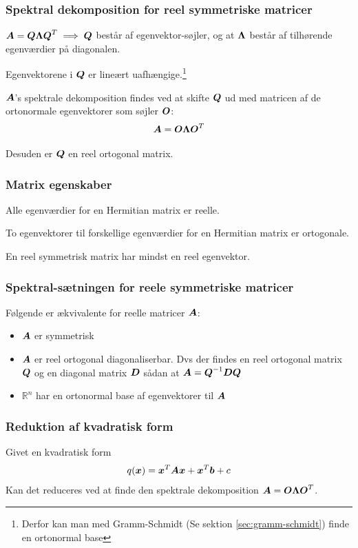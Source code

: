 \subsubsection{Spektral dekomposition for reel symmetriske matricer}

$\boldsymbol{A} = \boldsymbol{Q} \boldsymbol{\Lambda} \boldsymbol{Q}^T \implies \boldsymbol{Q}$ består af egenvektor-søjler, og at $\boldsymbol{\Lambda}$ består af tilhørende egenværdier på diagonalen.

Egenvektorene i $\boldsymbol{Q}$ er lineært uafhængige.\footnote{Derfor kan man med Gramm-Schmidt (Se sektion \ref{sec:gramm-schmidt}) finde en ortonormal base}

$\boldsymbol{A}$'s spektrale dekomposition findes ved at skifte $\boldsymbol{Q}$ ud med matricen af de ortonormale egenvektorer som søjler $\boldsymbol{O}$:
\[
\boldsymbol{A} = \boldsymbol{O} \boldsymbol{\Lambda} \boldsymbol{O}^T
\]

Desuden er $\boldsymbol{Q}$ en reel ortogonal matrix.

\subsubsection{Matrix egenskaber}
Alle egenværdier for en Hermitian matrix er reelle.

To egenvektorer til forskellige egenværdier for en Hermitian matrix er ortogonale.

En reel symmetrisk matrix har mindst en reel egenvektor.

\subsubsection{Spektral-sætningen for reele symmetriske matricer}
Følgende er ækvivalente for reelle matricer $\boldsymbol{A}$:
\begin{itemize}
    \item $\boldsymbol{A}$ er symmetrisk
    \item $\boldsymbol{A}$ er reel ortogonal diagonaliserbar. Dvs der findes en reel ortogonal matrix $\boldsymbol{Q}$ og en diagonal matrix $\boldsymbol{D}$ sådan at $\boldsymbol{A} = \boldsymbol{Q}^{-1} \boldsymbol{D} \boldsymbol{Q}$
    \item $\mathbb R^n$ har en ortonormal base af egenvektorer til $\boldsymbol{A}$
\end{itemize}

\subsubsection{Reduktion af kvadratisk form}
Givet en kvadratisk form 
\[
q(\boldsymbol{x}) = \boldsymbol{x}^T \boldsymbol{A} \boldsymbol{x} + \boldsymbol{x}^T \boldsymbol{b} + c
\]
Kan det reduceres ved at finde den spektrale dekomposition $\boldsymbol{A} = \boldsymbol{O} \boldsymbol{\Lambda} \boldsymbol{O}^T$.

